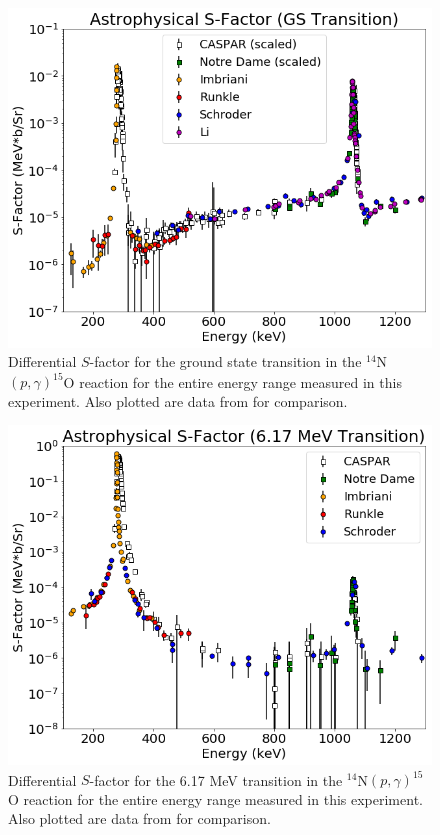 \begin{figure}
		\includegraphics[width=1.0\linewidth]{figures/fullGS.png}
	\caption{Differential $S$-factor for the ground state transition in the $^{14}$N$\left( p,\gamma \right) ^{15}$O reaction for the entire energy range measured in this experiment. Also plotted are data from \cite{Schroder1987, Imbriani2005, Runkle2005, Li2016} for comparison.  }
	\label{fig: fullGS}
\end{figure}

\begin{figure}
		\includegraphics[width=1.0\linewidth]{figures/full617.png}
	\caption{Differential $S$-factor for the 6.17 MeV transition in the $^{14}$N$\left( p,\gamma \right) ^{15}$O reaction for the entire energy range measured in this experiment. Also plotted are data from \cite{Schroder1987, Imbriani2005, Runkle2005, Li2016} for comparison.  }
	\label{fig: full617}
\end{figure}


